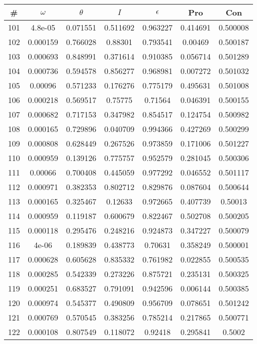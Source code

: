 \newpage
\begin{table}
\begin{tabular}{c|c|c|c|c|c|c}
\# & $\omega$ & $\theta$ & $I$ & $\epsilon$ & Pro & Con\\
\hline
101 & 4.8e-05 & 0.071551 & 0.511692 & 0.963227 & 0.414691 & 0.500008\\
102 & 0.000159 & 0.766028 & 0.88301 & 0.793541 & 0.00469 & 0.500187\\
103 & 0.000693 & 0.848991 & 0.371614 & 0.910385 & 0.056714 & 0.501289\\
104 & 0.000736 & 0.594578 & 0.856277 & 0.968981 & 0.007272 & 0.501032\\
105 & 0.00096 & 0.571233 & 0.176276 & 0.775179 & 0.495631 & 0.501008\\
106 & 0.000218 & 0.569517 & 0.75775 & 0.71564 & 0.046391 & 0.500155\\
107 & 0.000682 & 0.717153 & 0.347982 & 0.854517 & 0.124754 & 0.500982\\
108 & 0.000165 & 0.729896 & 0.040709 & 0.994366 & 0.427269 & 0.500299\\
109 & 0.000808 & 0.628449 & 0.267526 & 0.973859 & 0.171006 & 0.501227\\
110 & 0.000959 & 0.139126 & 0.775757 & 0.952579 & 0.281045 & 0.500306\\
111 & 0.00066 & 0.700408 & 0.445059 & 0.977292 & 0.046552 & 0.501117\\
112 & 0.000971 & 0.382353 & 0.802712 & 0.829876 & 0.087604 & 0.500644\\
113 & 0.000165 & 0.325467 & 0.12633 & 0.972665 & 0.407739 & 0.50013\\
114 & 0.000959 & 0.119187 & 0.600679 & 0.822467 & 0.502708 & 0.500205\\
115 & 0.000118 & 0.295476 & 0.248216 & 0.924873 & 0.347227 & 0.500079\\
116 & 4e-06 & 0.189839 & 0.438773 & 0.70631 & 0.358249 & 0.500001\\
117 & 0.000628 & 0.605628 & 0.835332 & 0.761982 & 0.022855 & 0.500535\\
118 & 0.000285 & 0.542339 & 0.273226 & 0.875721 & 0.235131 & 0.500325\\
119 & 0.000251 & 0.683527 & 0.791091 & 0.942596 & 0.006144 & 0.500385\\
120 & 0.000974 & 0.545377 & 0.490809 & 0.956709 & 0.078651 & 0.501242\\
121 & 0.000769 & 0.570545 & 0.383256 & 0.785214 & 0.217865 & 0.500771\\
122 & 0.000108 & 0.807549 & 0.118072 & 0.92418 & 0.295841 & 0.5002\\

\end{tabular}
\end{table}
